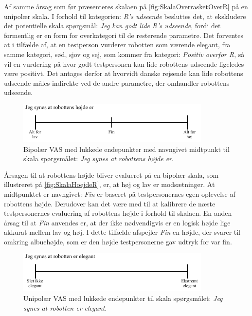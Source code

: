 \noindent
%
Af samme årsag som før præsenteres skalaen på \autoref{fig:SkalaOverrasketOverR} på en unipolær skala. \blankline
%
I forhold til kategorien: \textit{R's udseende} besluttes det, at ekskludere det potentielle skala spørgsmål: \textit{Jeg kan godt lide R's udseende}, fordi det formentlig er en form for overkategori til de resterende parametre. Det forventes at i tilfælde af, at en testperson vurderer robotten som værende elegant, fra samme kategori, sød, sjov og sej, som kommer fra kategori: \textit{Positiv overfor R}, så vil en vurdering på hvor godt testpersonen kan lide robottens udseende ligeledes være positivt. Det antages derfor at hvorvidt danske rejsende kan lide robottens udseende måles indirekte ved de andre parametre, der omhandler robottens udseende.
%
\begin{figure}[H]
\centering
\includegraphics[width =\textwidth]{Figure/UdvalgteSkalaer/HoejdeR} 
\caption{Bipolær VAS med lukkede endepunkter med navngivet midtpunkt til skala spørgsmålet: \textit{Jeg synes at robottens højde er}.}
\label{fig:SkalaHoejdeR}
\end{figure}
\noindent
%
Årsagen til at robottens højde bliver evalueret på en bipolær skala, som illustreret på \autoref{fig:SkalaHoejdeR}, er, at høj og lav er modsætninger. At midtpunktet er navngivet: \textit{Fin} er baseret på testpersonernes egen oplevelse af robottens højde. Derudover kan det være med til at kalibrere de næste testpersonernes evaluering af robottens højde i forhold til skalaen. En anden årsag til at \textit{Fin} anvendes er, at der ikke nødvendigvis er en logisk højde lige akkurat mellem lav og høj. I dette tilfælde afspejler \textit{Fin} en højde, der svarer til omkring albuehøjde, som er den højde testpersonerne gav udtryk for var fin. 
%
\begin{figure}[H]
\centering
\includegraphics[width =\textwidth]{Figure/UdvalgteSkalaer/ElegantR} 
\caption{Unipolær VAS med lukkede endepunkter til skala spørgsmålet: \textit{Jeg synes at robotten er elegant}.}
\label{fig:SkalaElegantR}
\end{figure}
